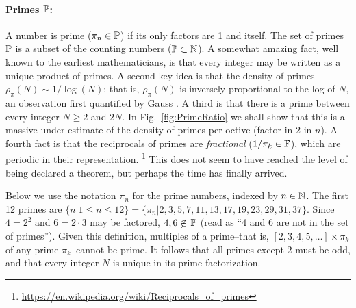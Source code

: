 \documentclass{ximera}
\begin{document}


\paragraph{Primes $\P$:}%

\label{page:bbP} %
A number is prime ($\pi_n \in\P$) if its only factors are 1 and itself. %
The set of primes $\P$ is a subset of the counting numbers ($\P \subset \N$). A somewhat amazing
fact, well known to the earliest mathematicians, is that every integer may be written as a unique
product of primes. A second key idea is that the density of primes $\rho_\pi(N) \sim 1/\log(N)$; that is, $\rho_\pi(N)$ is inversely proportional to the log of $N$,
an observation first quantified by Gauss \citep{Goldstein73}.
A third is that there is a prime between every integer $N\ge2$ and $2N$.  %
 
 \red
In Fig.~\ref{fig:PrimeRatio} we shall show that this is a massive under estimate of the density of primes per octive (factor in 2 in $n$).
%
A fourth fact is that the reciprocals of primes are \emph{fractional} ($1/\pi_k\in \F$), which are periodic in their representation.%
 \footnote{ \url{https://en.wikipedia.org/wiki/Reciprocals_of_primes}}
 \black
This does not seem to have reached the level of being declared a theorem, but perhaps the time has finally arrived.

Below we use the notation $\pi_n$ for the prime numbers, indexed by $n\in\N$. 
The first 12 primes are $\{n | 1 \le n \le 12\} = \{\pi_n | 2, 3, 5, 7, 11, 13, 17, 19, 23, 29, 31, 37 \}$.
Since $4=2^2$ and $6=2 \cdot 3$ may be factored,  $4, 6 \not\in \, \P$ (read as ``4 and 6
are not in the set of primes'').  Given this definition, multiples of a prime--that is, $[2, 3, 4, 5, \ldots] \times \pi_k$ of any prime $\pi_k$--cannot be prime.
It follows that all primes except 2 must be odd, and that every integer $N$ is unique in its prime factorization.
\end{document}
